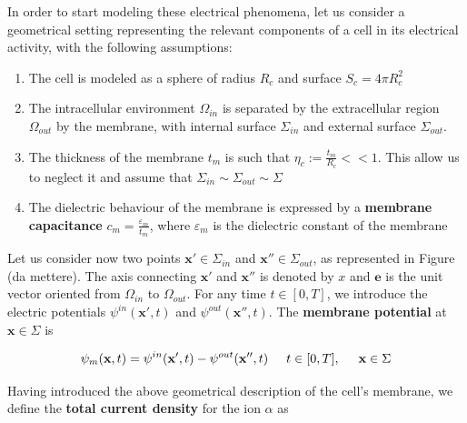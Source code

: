 \documentclass[12pt, a4paper]{article}
\begin{document}
In order to start modeling these electrical phenomena, let us consider a geometrical setting representing the relevant components of a cell in its electrical activity, with the following assumptions:

\begin{enumerate}
	
	\item The cell is modeled as a sphere of radius $R_c$ and surface $ S_c = 4\pi R_c^2$
	
	\item The intracellular environment $\Omega_{in}$ is separated by the extracellular region $\Omega_{out}$ by the membrane, with internal surface $\Sigma_{in}$ and external surface $\Sigma_{out}$.%
	
	\item The thickness of the membrane $t_m$ is such that $ \eta_c := \frac{t_m}{R_c} << 1$. This allow us to neglect it and assume that $\Sigma_{in} \sim \Sigma_{out} \sim \Sigma$ \label{ass 3}
	
	\item The dielectric behaviour of the membrane is expressed by a \textbf{membrane capacitance}  $ c_m = \frac{\varepsilon_m}{t_m} $, where $\varepsilon_m$ is the dielectric constant of the membrane \label{ass 4}
	
\end{enumerate}

Let us consider now two points $ \textbf{x}' \in \Sigma_{in}$ and $ \textbf{x}'' \in \Sigma_{out}$, as represented in Figure (da mettere). The axis connecting $ \textbf{x}'$ and $ \textbf{x}''$ is denoted by $x$ and $\textbf{e}$ is the unit vector oriented from $\Omega_{in}$ to $\Omega_{out}$. For any time $ t \in [0,T]$, we introduce the electric potentials $ \psi^{in} (\textbf{x}',t) $ and  $ \psi^{out} (\textbf{x}'',t) $. The \textbf{membrane potential} at $ \textbf{x} \in \Sigma$ is 

\begin{equation}
\psi_m (\textbf{x},t) = \psi^{in} (\textbf{x}',t) -  \psi^{out} (\textbf{x}'',t) \hspace{0.5 cm}  t \in [0,T], \hspace{0.5 cm} \textbf{x} \in \Sigma
\end{equation}



Having introduced the above geometrical description of the cell's membrane, we define the \textbf{total current density} for the  ion $\alpha$ as
\end{document}
